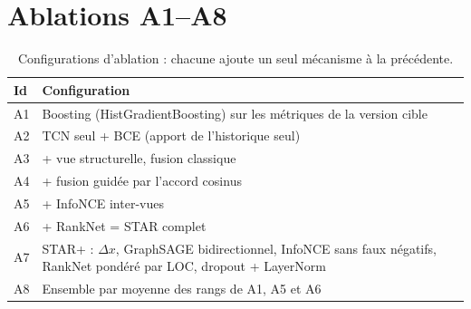 \documentclass[11pt,a4paper,openany]{report}
\begin{document}
\section{Ablations A1--A8}
\begin{table}[htbp]
\centering\small
\caption{Configurations d'ablation : chacune ajoute un seul mécanisme à la précédente.}
\label{tab:ablations-def}
\begin{tabularx}{\linewidth}{@{}lX@{}}
\toprule
\textbf{Id} & \textbf{Configuration} \\
\midrule
A1 & Boosting (HistGradientBoosting) sur les métriques de la version cible \\
A2 & TCN seul + BCE (apport de l'historique seul) \\
A3 & + vue structurelle, fusion classique \\
A4 & + fusion guidée par l'accord cosinus \\
A5 & + InfoNCE inter-vues \\
A6 & + RankNet = STAR complet \\
A7 & STAR+ : $\Delta x$, GraphSAGE bidirectionnel, InfoNCE sans faux négatifs, RankNet pondéré par LOC, dropout + LayerNorm \\
A8 & Ensemble par moyenne des rangs de A1, A5 et A6 \\
\bottomrule
\end{tabularx}
\end{table}
\end{document}

